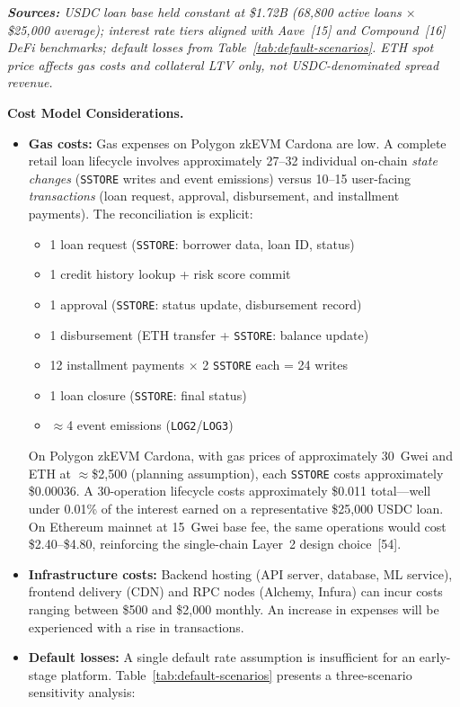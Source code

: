 \documentclass[12pt,a4paper]{report}
\begin{document}
\vspace{4pt}
\noindent\textit{\small\textbf{Sources:} USDC loan base held constant at \$1.72B (68{,}800 active loans $\times$ \$25{,}000 average); interest rate tiers aligned with Aave~[15] and Compound~[16] DeFi benchmarks; default losses from Table~\ref{tab:default-scenarios}. ETH spot price affects gas costs and collateral LTV only, not USDC-denominated spread revenue.}

\vspace{6pt}
\noindent\textbf{Cost Model Considerations.}

\begin{itemize}[noitemsep]
\item \textbf{Gas costs:} Gas expenses on Polygon zkEVM Cardona are low. A complete retail loan lifecycle involves approximately 27--32 individual on-chain \textit{state changes} (\texttt{SSTORE} writes and event emissions) versus 10--15 user-facing \textit{transactions} (loan request, approval, disbursement, and installment payments). The reconciliation is explicit:
\label{sec:gas-cost}
\begin{itemize}[noitemsep]
  \item 1 loan request (\texttt{SSTORE}: borrower data, loan ID, status)
  \item 1 credit history lookup + risk score commit
  \item 1 approval (\texttt{SSTORE}: status update, disbursement record)
  \item 1 disbursement (ETH transfer + \texttt{SSTORE}: balance update)
  \item 12 installment payments $\times$ 2 \texttt{SSTORE} each = 24 writes
  \item 1 loan closure (\texttt{SSTORE}: final status)
  \item $\approx$4 event emissions (\texttt{LOG2}/\texttt{LOG3})
\end{itemize}
On Polygon zkEVM Cardona, with gas prices of approximately 30~Gwei and ETH at $\approx$\$2{,}500 (planning assumption), each \texttt{SSTORE} costs approximately \$0.00036. A 30-operation lifecycle costs approximately \$0.011 total---well under 0.01\% of the interest earned on a representative \$25{,}000 USDC loan. On Ethereum mainnet at 15~Gwei base fee, the same operations would cost \$2.40--\$4.80, reinforcing the single-chain Layer~2 design choice~[54].
\item \textbf{Infrastructure costs:} Backend hosting (API server, database, ML service), frontend delivery (CDN) and RPC nodes (Alchemy, Infura) can incur costs ranging between \$500 and \$2,000 monthly. An increase in expenses will be experienced with a rise in transactions.
\item \textbf{Default losses:} A single default rate assumption is insufficient for an early-stage platform. Table~\ref{tab:default-scenarios} presents a three-scenario sensitivity analysis:


\end{itemize}
\end{document}
